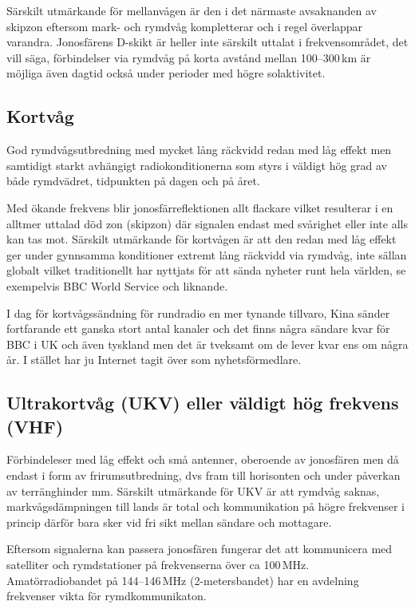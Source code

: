 Särskilt utmärkande för mellanvågen är den i det närmaste avsaknanden av
skipzon eftersom mark- och rymdvåg kompletterar och i regel överlappar
varandra. Jonosfärens D-skikt är heller inte särskilt uttalat i
frekvensområdet, det vill säga, förbindelser via rymdvåg på korta avstånd
mellan 100--300\,km är möjliga även dagtid också under perioder med högre
solaktivitet.

\subsection{Kortvåg}

God rymdvågsutbredning med mycket lång räckvidd redan med låg effekt men
samtidigt starkt avhängigt radiokonditionerna som styrs i väldigt hög grad av
både rymdvädret, tidpunkten på dagen och på året.

Med ökande frekvens blir jonosfärreflektionen allt flackare vilket resulterar
i en alltmer uttalad död zon (skipzon) där signalen endast med svårighet eller
inte alls kan tas mot. Särskilt utmärkande för kortvågen är att den redan med
låg effekt ger under gynnsamma konditioner extremt lång räckvidd via rymdvåg,
inte sällan globalt vilket traditionellt har nyttjats för att sända nyheter
runt hela världen, se exempelvis BBC World Service och liknande.

I dag för kortvågssändning för rundradio en mer tynande tillvaro, Kina sänder
fortfarande ett ganska stort antal kanaler och det finns några sändare kvar
för BBC i UK och även tyskland men det är tveksamt om de lever kvar ens om
några år. I stället har ju Internet tagit över som nyhetsförmedlare.

\subsection{Ultrakortvåg (UKV) eller väldigt hög frekvens (VHF)}

Förbindeleser med låg effekt och små antenner, oberoende av jonosfären men då
endast i form av frirumsutbredning, dvs fram till horisonten och under
påverkan av terränghinder mm. Särskilt utmärkande för UKV är att rymdvåg
saknas, markvågsdämpningen till lands är total och kommunikation på högre
frekvenser i princip därför bara sker vid fri sikt mellan sändare och
mottagare.

Eftersom signalerna kan passera jonosfären fungerar det att kommunicera med
satelliter och rymdstationer på frekvenserna över ca 100\,MHz.
Amatörradiobandet på 144--146\,MHz (2-metersbandet) har en avdelning
frekvenser vikta för rymdkommunikaton.

